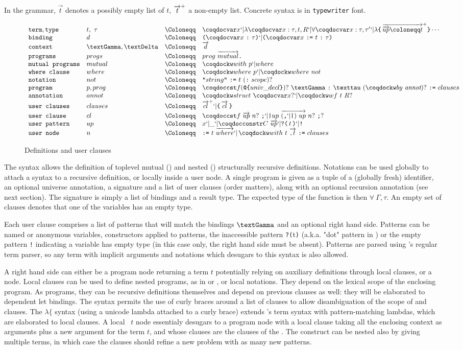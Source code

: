 In the grammar, $\vec{t}$ denotes a possibly empty list of $t$,
${\overrightarrow{t}}^{+}$ a non-empty list. Concrete syntax is in
\texttt{typewriter} font.
\begin{figure}[h]
\centering$\figdefs$
\caption{Definitions and user clauses}
\label{fig:usergram}
\end{figure}
The syntax allows the definition of toplevel mutual () and
nested () structurally recursive definitions. 
Notations can be used globally to attach a syntax to a 
recursive definition, or locally inside a user node. A single program is given as a tuple of a (globally
fresh) identifier, an optional universe annotation, 
a signature and a list of user clauses (order matters), along with an optional recursion annotation (see next
section). The signature is simply a list of bindings and a result
type. The expected type of the function  is then $\forall~\Gamma, \tau$.
An empty set of clauses denotes that one of the variables has an empty type.

Each user clause comprises a list of patterns that will match the
bindings $\textGamma$ and an optional right hand side. Patterns can be named or
anonymous variables, constructors applied to patterns, the inaccessible
pattern \texttt{?(}t\texttt{)} (a.k.a. "dot" pattern in \Agda) or the
empty pattern \texttt{!} indicating a variable has empty type (in this
case only, the right hand side must be absent). Patterns are parsed
using \Coq's regular term parser, so any term with implicit arguments
and notations which desugars to this syntax is also allowed.

A right hand side can either be a program node returning a term $t$
potentially relying on auxiliary definitions through local 
clauses, or a  node.  Local  clauses can be used to
define nested programs, as in \Haskell or \Agda, or local
notations. They depend on the lexical scope of the enclosing program. As
programs, they can be recursive definitions themselves and depend on
previous  clauses as well: they will be elaborated to
dependent let bindings. The syntax permits the use of curly braces
around a list of clauses to allow disambiguation of the scope of
 and  clauses. The $\lambda\{$ syntax (using a
unicode lambda attached to a curly brace) extends \Coq's term syntax
with pattern-matching lambdas, which are elaborated to local 
clauses. A local ~$t$ node essentialy desugars to a program
node with a local  clause taking all the enclosing context as
arguments plus a new argument for the term $t$, and whose clauses are
the clauses of the . The  construct can be nested also
by giving multiple terms, in which case the clauses should refine a new
problem with as many new patterns.

